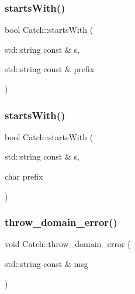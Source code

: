 \mbox{\label{namespace_catch_a695f62327be0676e046291eeaae15110}} 
\subsubsection{\texorpdfstring{starts\+With()}{startsWith()}\hspace{0.1cm}{\footnotesize\ttfamily [1/2]}}
{\footnotesize\ttfamily bool Catch\+::starts\+With (\begin{DoxyParamCaption}\item[{std\+::string const \&}]{s,  }\item[{std\+::string const \&}]{prefix }\end{DoxyParamCaption})}

\mbox{\label{namespace_catch_acad23751846ac23d0f379e34f5adebb1}} 
\subsubsection{\texorpdfstring{starts\+With()}{startsWith()}\hspace{0.1cm}{\footnotesize\ttfamily [2/2]}}
{\footnotesize\ttfamily bool Catch\+::starts\+With (\begin{DoxyParamCaption}\item[{std\+::string const \&}]{s,  }\item[{char}]{prefix }\end{DoxyParamCaption})}

\mbox{\label{namespace_catch_ae67297c3e265b0fcd55de371bf408e4e}} 
\subsubsection{\texorpdfstring{throw\+\_\+domain\+\_\+error()}{throw\_domain\_error()}}
{\footnotesize\ttfamily void Catch\+::throw\+\_\+domain\+\_\+error (\begin{DoxyParamCaption}\item[{std\+::string const \&}]{msg }\end{DoxyParamCaption})}

